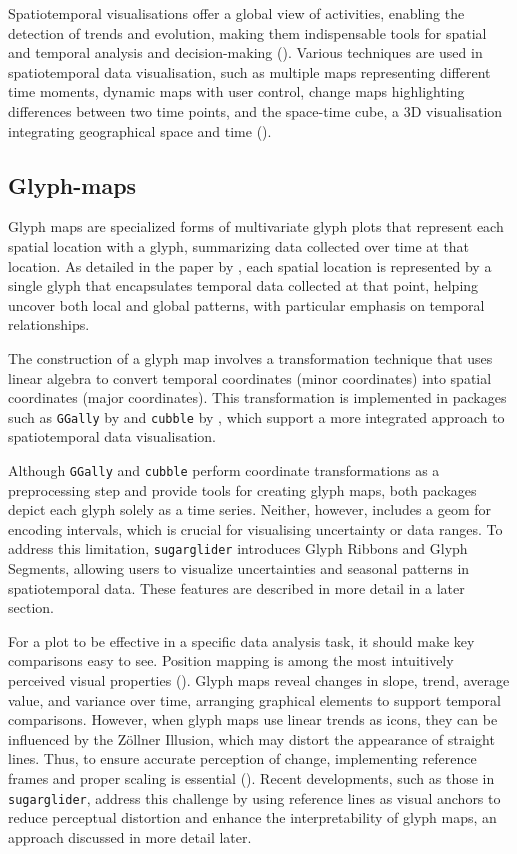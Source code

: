 Spatiotemporal visualisations offer a global view of activities, enabling the detection of trends and evolution, making them indispensable tools for spatial and temporal analysis and decision-making (\citet{zhong2012spatiotemporal}). Various techniques are used in spatiotemporal data visualisation, such as multiple maps representing different time moments, dynamic maps with user control, change maps highlighting differences between two time points, and the space-time cube, a 3D visualisation integrating geographical space and time (\citet{andrienko2003exploratory}).

\subsection{Glyph-maps}\label{glyph-maps}

Glyph maps are specialized forms of multivariate glyph plots that represent each spatial location with a glyph, summarizing data collected over time at that location. As detailed in the paper by \citet{wickham2012glyph}, each spatial location is represented by a single glyph that encapsulates temporal data collected at that point, helping uncover both local and global patterns, with particular emphasis on temporal relationships.

The construction of a glyph map involves a transformation technique that uses linear algebra to convert temporal coordinates (minor coordinates) into spatial coordinates (major coordinates). This transformation is implemented in packages such as \texttt{GGally} by \citet{GGally} and \texttt{cubble} by \citet{JSSv110i07}, which support a more integrated approach to spatiotemporal data visualisation.

Although \texttt{GGally} and \texttt{cubble} perform coordinate transformations as a preprocessing step and provide tools for creating glyph maps, both packages depict each glyph solely as a time series. Neither, however, includes a geom for encoding intervals, which is crucial for visualising uncertainty or data ranges. To address this limitation, \texttt{sugarglider} introduces Glyph Ribbons and Glyph Segments, allowing users to visualize uncertainties and seasonal patterns in spatiotemporal data. These features are described in more detail in a later section.

For a plot to be effective in a specific data analysis task, it should make key comparisons easy to see. Position mapping is among the most intuitively perceived visual properties (\citet{f076b642-1914-3749-af10-4b3bcbdaef52}). Glyph maps reveal changes in slope, trend, average value, and variance over time, arranging graphical elements to support temporal comparisons. However, when glyph maps use linear trends as icons, they can be influenced by the Zöllner Illusion, which may distort the appearance of straight lines. Thus, to ensure accurate perception of change, implementing reference frames and proper scaling is essential (\citet{wickham2012glyph}). Recent developments, such as those in \texttt{sugarglider}, address this challenge by using reference lines as visual anchors to reduce perceptual distortion and enhance the interpretability of glyph maps, an approach discussed in more detail later.

